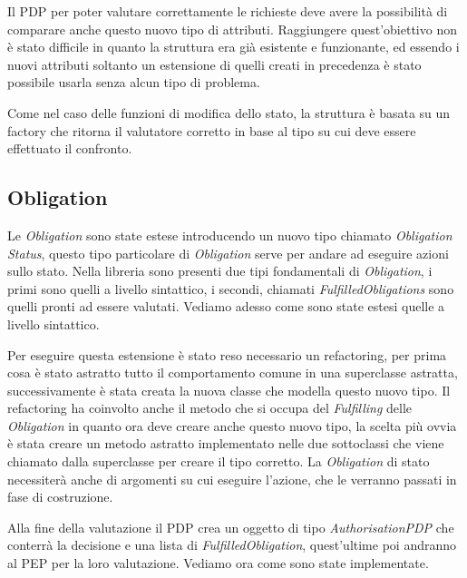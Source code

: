 Il \ac{PDP} per poter valutare correttamente le richieste deve avere la possibilità di comparare anche questo nuovo tipo di attributi.
Raggiungere quest'obiettivo non è stato difficile in quanto la struttura era già esistente e funzionante, ed essendo i nuovi attributi soltanto un estensione di quelli 
creati in precedenza è stato possibile usarla senza alcun tipo di problema.\par


Come nel caso delle funzioni di modifica dello stato, la struttura è basata su un factory che ritorna il valutatore corretto in base al tipo su cui deve essere effettuato il confronto.

\subsection{Obligation}
\label{sub:estensione_obligation}
Le \textit{Obligation} sono state estese introducendo un nuovo tipo chiamato \textit{Obligation Status}, questo tipo particolare di \textit{Obligation} serve per andare ad eseguire azioni sullo stato.
Nella libreria sono presenti due tipi fondamentali di \textit{Obligation}, i primi sono quelli a livello sintattico, i secondi, chiamati \textit{FulfilledObligations} sono quelli pronti ad essere valutati. Vediamo adesso come sono state estesi quelle a livello sintattico. \par
Per eseguire questa estensione è stato reso necessario un refactoring, per prima cosa è stato astratto tutto il comportamento comune in una superclasse astratta, successivamente è stata creata la nuova classe che modella questo nuovo tipo.
Il refactoring ha coinvolto anche il metodo che si occupa del \textit{Fulfilling} delle \textit{Obligation} in quanto ora deve creare anche questo nuovo tipo, la scelta più ovvia è stata creare un metodo astratto implementato nelle due sottoclassi che viene chiamato dalla superclasse per creare il tipo corretto.
La \textit{Obligation} di stato necessiterà anche di argomenti su cui eseguire l'azione, che le verranno passati in fase di costruzione. \par
Alla fine della valutazione il \ac{PDP} crea un oggetto di tipo \textit{AuthorisationPDP} che conterrà la decisione e una lista di \textit{FulfilledObligation}, quest'ultime poi andranno al \ac{PEP} per la loro valutazione. Vediamo ora come sono state implementate. \par
